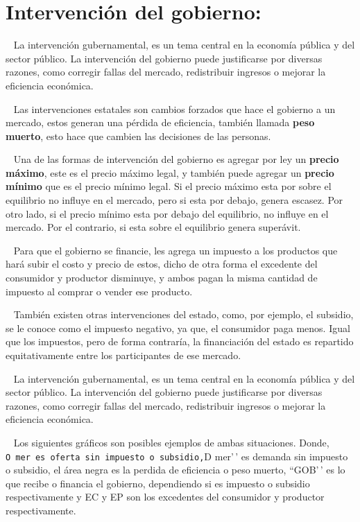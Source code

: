 \documentclass[
  letterpaper,
  DIV=11,
  numbers=noendperiod]{scrreport}
\begin{document}
\hypertarget{intervenciuxf3n-del-gobierno}{%
\section{Intervención del
gobierno:}\label{intervenciuxf3n-del-gobierno}}

~ La intervención gubernamental, es un tema central en la economía
pública y del sector público. La intervención del gobierno puede
justificarse por diversas razones, como corregir fallas del mercado,
redistribuir ingresos o mejorar la eficiencia económica.

~ Las intervenciones estatales son cambios forzados que hace el gobierno
a un mercado, estos generan una pérdida de eficiencia, también llamada
\textbf{peso muerto}, esto hace que cambien las decisiones de las
personas.

~ Una de las formas de intervención del gobierno es agregar por ley un
\textbf{precio máximo}, este es el precio máximo legal, y también puede
agregar un \textbf{precio mínimo} que es el precio mínimo legal. Si el
precio máximo esta por sobre el equilibrio no influye en el mercado,
pero si esta por debajo, genera escasez. Por otro lado, si el precio
mínimo esta por debajo del equilibrio, no influye en el mercado. Por el
contrario, si esta sobre el equilibrio genera superávit.

~ Para que el gobierno se financie, les agrega un impuesto a los
productos que hará subir el costo y precio de estos, dicho de otra forma
el excedente del consumidor y productor disminuye, y ambos pagan la
misma cantidad de impuesto al comprar o vender ese producto.

~ También existen otras intervenciones del estado, como, por ejemplo, el
subsidio, se le conoce como el impuesto negativo, ya que, el consumidor
paga menos. Igual que los impuestos, pero de forma contraría, la
financiación del estado es repartido equitativamente entre los
participantes de ese mercado.

~ La intervención gubernamental, es un tema central en la economía
pública y del sector público. La intervención del gobierno puede
justificarse por diversas razones, como corregir fallas del mercado,
redistribuir ingresos o mejorar la eficiencia económica.

~ Los siguientes gráficos son posibles ejemplos de ambas situaciones.
Donde,
\texttt{O\ mer\textquotesingle{}\textquotesingle{}\ es\ oferta\ sin\ impuesto\ o\ subsidio,}D
mer'\,' es demanda sin impuesto o subsidio, el área negra es la perdida
de eficiencia o peso muerto, ``GOB'\,' es lo que recibe o financia el
gobierno, dependiendo si es impuesto o subsidio respectivamente y EC y
EP son los excedentes del consumidor y productor respectivamente.
\end{document}
